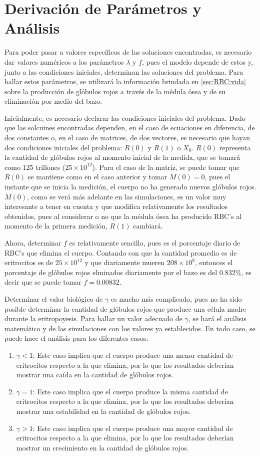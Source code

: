 \section{Derivación de Parámetros y Análisis}\label{sec:modelo:parametros}
Para poder pasar a valores específicos de las soluciones encontradas, es necesario dar valores numéricos a los parámetros $\lambda$ y $f$, pues el modelo depende de estos y, junto a las condiciones iniciales, determinan las soluciones del problema. Para hallar estos parámetros, se utilizará la información brindada en \ref{sec:RBC:vida} sobre la producción de glóbulos rojos a través de la médula ósea y de su eliminación por medio del bazo.

Inicialmente, es necesario declarar las condiciones iniciales del problema. Dado que las solcuines encontradas dependen, en el caso de ecuaciones en diferencia, de dos constantes o, en el caso de matrices, de dos vectores, es necesario que hayan dos condiciones iniciales del problema: $R(0)$ y $R(1)$ o $X_0$. $R(0)$ representa la cantidad de glóbulos rojos al momento inicial de la medida, que se tomará como 125 trillones ($25\times 10^{12}$). Para el caso de la matriz, se puede tomar que $R(0)$ se mantiene como en el caso anterior y tomar $M(0)=0$, pues el instante que se inicia la medición, el cuerpo no ha generado nuevos glóbulos rojos. $M(0)$, como se verá más adelante en las simulaciones, es un valor muy interesante a tener en cuenta y que modifica relativamente los resultados obtenidos, pues al considerar o no que la médula ósea ha producido RBC's al momento de la primera medición, $R(1)$ cambiará.

Ahora, determinar $f$ es relativamente sencillo, pues es el porcentaje diario de RBC's que elimina el cuerpo. Contando con que la cantidad promedio es de eritrocitos es de $25\times 10^{12}$ y que diariamente mueren $208\times 10^{9}$, entonces el porcentaje de glóbulos rojos elminados diariamente por el bazo es del $0.832\%$, es decir que se puede tomar $f=0.00832$. 

Determinar el valor biológico de $\gamma$ es mucho más complicado, pues no ha sido posible determinar la cantidad de glóbulos rojos que produce una célula madre durante la eritropoyesis. Para hallar un valor adecuado de $\gamma$, se hará el análisis matemático y de las simulaciones con los valores ya establecidos. En todo caso, se puede hace el análisis para los diferentes casos:
\begin{enumerate}
    \item  $\gamma<1$: Este caso implica que el cuerpo produce una menor cantidad de eritrocitos respecto a la que elimina, por lo que los resultados deberían mostrar una caída en la cantidad de glóbulos rojos.
    \item $\gamma=1$: Este caso implica que el cuerpo produce la misma cantidad de eritrocitos respecto a la que elimina, por lo que los resultados deberían mostrar una estabilidad en la cantidad de glóbulos rojos.
    \item  $\gamma>1$: Este caso implica que el cuerpo produce una mayor cantidad de eritrocitos respecto a la que elimina, por lo que los resultados deberían mostrar un crecimiento en la cantidad de glóbulos rojos.
\end{enumerate}

